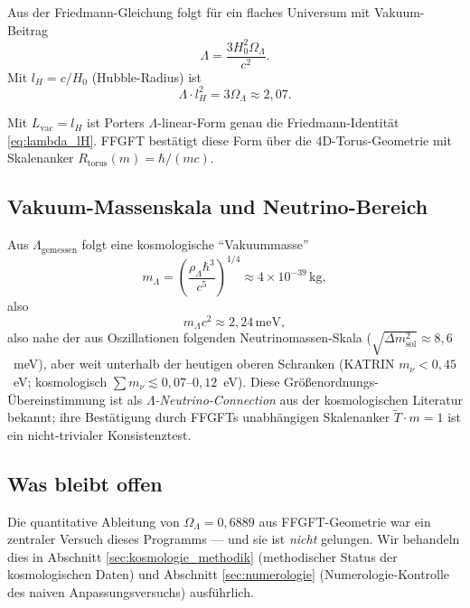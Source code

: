 Aus der Friedmann-Gleichung folgt für ein flaches Universum mit Vakuum-Beitrag
\begin{equation}
\Lambda = \frac{3 H_0^2 \Omega_\Lambda}{c^2}.
\end{equation}
Mit \(l_H = c/H_0\) (Hubble-Radius) ist
\begin{equation}
\Lambda \cdot l_H^2 = 3 \Omega_\Lambda \approx 2{,}07.
\label{eq:lambda_lH}
\end{equation}

\begin{keyresult}
Mit \(L_\text{vac} = l_H\) ist Porters \(\Lambda\)-linear-Form genau die Friedmann-Identität \eqref{eq:lambda_lH}. FFGFT bestätigt diese Form über die 4D-Torus-Geometrie mit Skalenanker \(R_\text{torus}(m) = \hbar/(mc)\).
\end{keyresult}

\subsection{Vakuum-Massenskala und Neutrino-Bereich}

Aus \(\Lambda_\text{gemessen}\) folgt eine kosmologische ``Vakuummasse''
\begin{equation}
m_\Lambda = \left(\frac{\rho_\Lambda \hbar^3}{c^5}\right)^{1/4} \approx 4 \times 10^{-39}\,\text{kg},
\end{equation}
also
\begin{equation}
m_\Lambda c^2 \approx 2{,}24\,\text{meV},
\end{equation}
also nahe der aus Oszillationen folgenden Neutrinomassen-Skala ($\sqrt{\Delta m^2_{\text{sol}}} \approx 8{,}6$~meV), aber weit unterhalb der heutigen oberen Schranken (KATRIN $m_\nu < 0{,}45$~eV; kosmologisch $\sum m_\nu \lesssim 0{,}07$--$0{,}12$~eV). Diese Größenordnungs-Übereinstimmung ist als \emph{\(\Lambda\)-Neutrino-Connection} aus der kosmologischen Literatur bekannt; ihre Bestätigung durch FFGFTs unabhängigen Skalenanker \(\tilde T \cdot m = 1\) ist ein nicht-trivialer Konsistenztest.

\subsection{Was bleibt offen}

Die quantitative Ableitung von \(\Omega_\Lambda = 0{,}6889\) aus FFGFT-Geometrie war ein zentraler Versuch dieses Programms — und sie ist \emph{nicht} gelungen. Wir behandeln dies in Abschnitt \ref{sec:kosmologie_methodik} (methodischer Status der kosmologischen Daten) und Abschnitt \ref{sec:numerologie} (Numerologie-Kontrolle des naiven Anpassungsversuchs) ausführlich.

